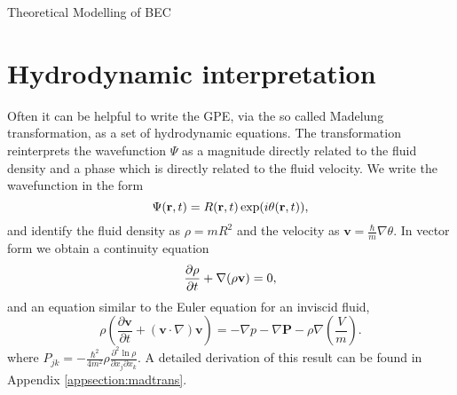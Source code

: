 \begin{chapter}{\label{cha:theoretical_model}Theoretical Modelling of BEC}
\section{\label{section:hydrodynamic} Hydrodynamic interpretation}
	Often it can be helpful to write the GPE, via the so called Madelung transformation, as a set of hydrodynamic equations. The transformation reinterprets the wavefunction $\Psi$ as a magnitude directly related to the fluid density and a phase which is directly related to the fluid velocity. We write the wavefunction in the form
	\begin{equation}
		\Psi({\bf r},t) = R({\bf r},t)\exp (i\theta({\bf r},t)),
	\end{equation}
	 and identify the fluid density as $\rho=mR^2$ and the velocity as $\mathbf{v} = \frac{\hbar}{m}\nabla\theta$.
	In vector form we obtain a continuity equation
	\begin{equation}
	  \frac{\partial \rho}{\partial t} + \nabla(\rho{\bf v}) = 0,
	  \label{eq:MTcont}
	\end{equation}
	and an equation similar to the Euler equation for an inviscid fluid,
	\begin{equation}
	\rho\left( \frac{\partial \mathbf{v}}{\partial t} + \left( \mathbf{v} \cdot \nabla \right)\mathbf{v} \right) = -\nabla p - \nabla \mathbf{P} - \rho \nabla \left(\frac{V}{m}\right).
	\end{equation}
	where $P_{jk} = -\frac{\hbar^2}{4m^2}\rho\frac{\partial^2\ln{\rho}}{\partial x_j \partial x_k}$.
	A detailed derivation of this result can be found in Appendix \ref{appsection:madtrans}.


\end{chapter}
